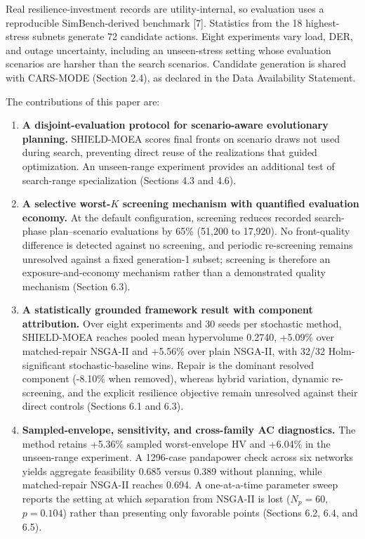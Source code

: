 \documentclass[
  10pt,
  a4paper,
]{article}
\providecommand{\tightlist}{%
  \setlength{\itemsep}{0pt}\setlength{\parskip}{0pt}}
\begin{document}
Real resilience-investment records are utility-internal, so evaluation
uses a reproducible SimBench-derived benchmark {[}7{]}. Statistics from
the 18 highest-stress subnets generate 72 candidate actions. Eight
experiments vary load, DER, and outage uncertainty, including an
unseen-stress setting whose evaluation scenarios are harsher than the
search scenarios. Candidate generation is shared with CARS-MODE (Section
2.4), as declared in the Data Availability Statement.

The contributions of this paper are:

\begin{enumerate}
\def\labelenumi{\arabic{enumi}.}
\tightlist
\item
  \textbf{A disjoint-evaluation protocol for scenario-aware evolutionary
  planning.} SHIELD-MOEA scores final fronts on scenario draws not used
  during search, preventing direct reuse of the realizations that guided
  optimization. An unseen-range experiment provides an additional test
  of search-range specialization (Sections 4.3 and 4.6).
\item
  \textbf{A selective worst-\(K\) screening mechanism with quantified
  evaluation economy.} At the default configuration, screening reduces
  recorded search-phase plan--scenario evaluations by 65\% (51,200 to
  17,920). No front-quality difference is detected against no screening,
  and periodic re-screening remains unresolved against a fixed
  generation-1 subset; screening is therefore an exposure-and-economy
  mechanism rather than a demonstrated quality mechanism (Section 6.3).
\item
  \textbf{A statistically grounded framework result with component
  attribution.} Over eight experiments and 30 seeds per stochastic
  method, SHIELD-MOEA reaches pooled mean hypervolume 0.2740, +5.09\%
  over matched-repair NSGA-II and +5.56\% over plain NSGA-II, with 32/32
  Holm-significant stochastic-baseline wins. Repair is the dominant
  resolved component (-8.10\% when removed), whereas hybrid variation,
  dynamic re-screening, and the explicit resilience objective remain
  unresolved against their direct controls (Sections 6.1 and 6.3).
\item
  \textbf{Sampled-envelope, sensitivity, and cross-family AC
  diagnostics.} The method retains +5.36\% sampled worst-envelope HV and
  +6.04\% in the unseen-range experiment. A 1296-case pandapower check
  across six networks yields aggregate feasibility 0.685 versus 0.389
  without planning, while matched-repair NSGA-II reaches 0.694. A
  one-at-a-time parameter sweep reports the setting at which separation
  from NSGA-II is lost (\(N_p=60\), \(p=0.104\)) rather than presenting
  only favorable points (Sections 6.2, 6.4, and 6.5).
\end{enumerate}
\end{document}
